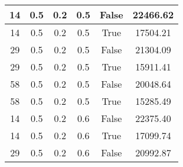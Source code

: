 \documentclass[12pt]{article}
\begin{document}
\begin{table}[h!]
\begin{tabular}{|c|c|c|c|c|c|}
14  &  0.5  &  0.2  &  0.5  &  False  &  22466.62\\ \hline
14  &  0.5  &  0.2  &  0.5  &  True  &  17504.21\\ \hline
29  &  0.5  &  0.2  &  0.5  &  False  &  21304.09\\ \hline
29  &  0.5  &  0.2  &  0.5  &  True  &  15911.41\\ \hline
58  &  0.5  &  0.2  &  0.5  &  False  &  20048.64\\ \hline
58  &  0.5  &  0.2  &  0.5  &  True  &  15285.49\\ \hline
14  &  0.5  &  0.2  &  0.6  &  False  &  22375.40\\ \hline
14  &  0.5  &  0.2  &  0.6  &  True  &  17099.74\\ \hline
29  &  0.5  &  0.2  &  0.6  &  False  &  20992.87\\ \hline
\end{tabular}
\end{table}
\end{document}
